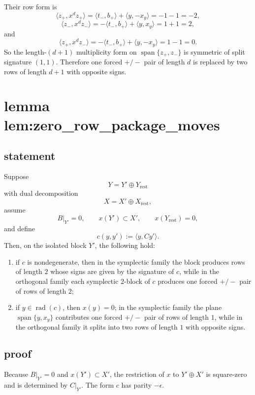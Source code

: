\documentclass[
]{article}
\providecommand{\tightlist}{%
  \setlength{\itemsep}{0pt}\setlength{\parskip}{0pt}}
\begin{document}
Their row form is \[
\langle z_+,x^d z_+\rangle
=\langle t_-,b_+\rangle+\langle y,-x_y\rangle
=-1-1=-2,
\] \[
\langle z_-,x^d z_-\rangle
=-\langle t_-,b_+\rangle+\langle y,x_y\rangle
=1+1=2,
\] and \[
\langle z_+,x^d z_-\rangle
=-\langle t_-,b_+\rangle+\langle y,-x_y\rangle
=1-1=0.
\] So the length-\((d+1)\) multiplicity form on
\(\operatorname{span}\{z_+,z_-\}\) is symmetric of split signature
\((1,1)\). Therefore one forced \(+/-\) pair of length \(d\) is replaced
by two rows of length \(d+1\) with opposite signs.

\section{lemma
lem:zero\_row\_package\_moves}\label{lemma-lemzero_row_package_moves}

\subsection{statement}\label{statement-9}

Suppose \[
Y=Y'\oplus Y_{\mathrm{rest}}
\] with dual decomposition \[
X=X'\oplus X_{\mathrm{rest}},
\] assume \[
B|_{Y'}=0,\qquad x(Y')\subset X',\qquad x(Y_{\mathrm{rest}})=0,
\] and define \[
c(y,y'):=\langle y,Cy'\rangle.
\] Then, on the isolated block \(Y'\), the following hold:

\begin{enumerate}
\def\labelenumi{\arabic{enumi}.}
\tightlist
\item
  if \(c\) is nondegenerate, then in the symplectic family the block
  produces rows of length \(2\) whose signs are given by the signature
  of \(c\), while in the orthogonal family each symplectic \(2\)-block
  of \(c\) produces one forced \(+/-\) pair of rows of length \(2\);
\item
  if \(y\in \operatorname{rad}(c)\), then \(x(y)=0\); in the symplectic
  family the plane \(\operatorname{span}\{y,x_y\}\) contributes one
  forced \(+/-\) pair of rows of length \(1\), while in the orthogonal
  family it splits into two rows of length \(1\) with opposite signs.
\end{enumerate}

\subsection{proof}\label{proof-9}

Because \(B|_{Y'}=0\) and \(x(Y')\subset X'\), the restriction of \(x\)
to \(Y'\oplus X'\) is square-zero and is determined by \(C|_{Y'}\). The
form \(c\) has parity \(-\epsilon\).
\end{document}
